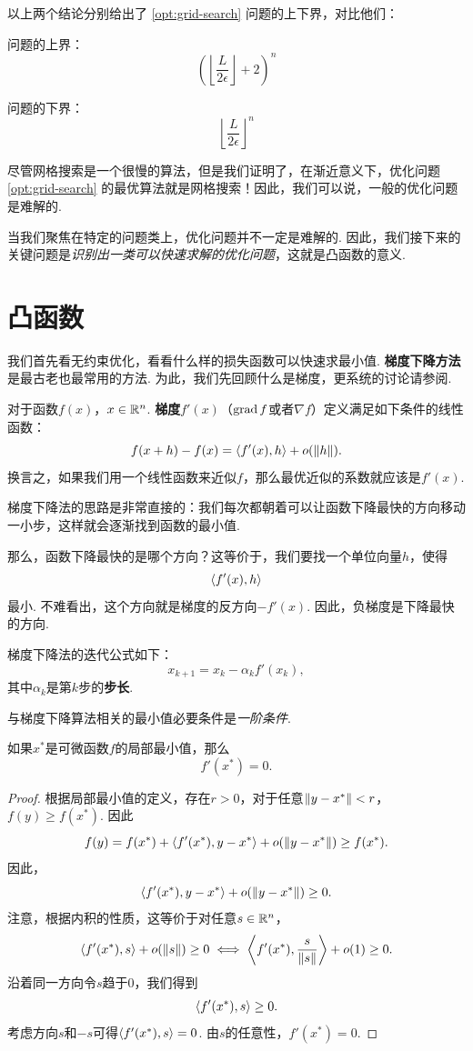 以上两个结论分别给出了 \eqref{opt:grid-search} 问题的上下界，对比他们：
\begin{center}
\begin{minipage}[t]{0.4\textwidth}
问题的上界：
\[\left(\left\lfloor\frac{L}{2\epsilon}\right\rfloor+2\right)^n\]
\end{minipage}
\begin{minipage}[t]{0.4\textwidth}
问题的下界：
    \[\left\lfloor\frac{L}{2\epsilon}\right\rfloor^n\]
\end{minipage}
\end{center}
尽管网格搜索是一个很慢的算法，但是我们证明了，在渐近意义下，优化问题 \eqref{opt:grid-search} 的最优算法就是网格搜索！因此，我们可以说，一般的优化问题是难解的. 

当我们聚焦在特定的问题类上，优化问题并不一定是难解的. 因此，我们接下来的关键问题是\textit{识别出一类可以快速求解的优化问题}，这就是凸函数的意义. 


\section{凸函数}\label{sec:convex-function}

我们首先看无约束优化，看看什么样的损失函数可以快速求最小值. \textbf{梯度下降方法}是最古老也最常用的方法. 为此，我们先回顾什么是梯度，更系统的讨论请参阅.

对于函数$f(x)$，$x\in\mathbb{R}^n$. \textbf{梯度}$f'(x)$（$\operatorname*{grad} f$或者$\nabla f$）定义满足如下条件的线性函数：
    \[f(x+h)-f(x)=\left\langle{f'(x)},{h}\right\rangle+o(\left\|h\right\|).\]
换言之，如果我们用一个线性函数来近似$f$，那么最优近似的系数就应该是$f'(x)$.

梯度下降法的思路是非常直接的：我们每次都朝着可以让函数下降最快的方向移动一小步，这样就会逐渐找到函数的最小值. 

那么，函数下降最快的是哪个方向？这等价于，我们要找一个单位向量$h$，使得
\[\left\langle{f'(x)},{h}\right\rangle\]
最小. 不难看出，这个方向就是梯度的反方向$-f'(x)$. 因此，负梯度是下降最快的方向. 

梯度下降法的迭代公式如下：
\[x_{k+1}=x_k-\alpha_k f'(x_k),\]
其中$\alpha_k$是第$k$步的\textbf{步长}. 

与梯度下降算法相关的最小值必要条件是\textit{一阶条件}. 

\begin{theorem}[一阶条件]\label{thm:first-order-condition}
    如果$x^*$是可微函数$f$的局部最小值，那么
    \[f'(x^*)=0.\]
\end{theorem}

\begin{proof}
根据局部最小值的定义，存在$r>0$，对于任意$\left\|y-x^*\right\|<r$，$f(y)\geq f(x^*)$. 因此
\[f(y)=f(x^*)+\left\langle{f'(x^*)},{y-x^*}\right\rangle+o(\left\|y-x^*\right\|)\geq f(x^*).\]
因此，
\[\left\langle{f'(x^*)},{y-x^*}\right\rangle+o(\left\|y-x^*\right\|)\geq 0.\]
注意，根据内积的性质，这等价于对任意$s\in\mathbb{R}^n$，
\[\left\langle{f'(x^*)},{s}\right\rangle+o(\left\|s\right\|)\geq 0\iff \left\langle{f'(x^*)},{\frac{s}{\left\|s\right\|}}\right\rangle+o(1)\geq 0.\]
沿着同一方向令$s$趋于$0$，我们得到
\[\left\langle{f'(x^*)},{s}\right\rangle\geq 0.\]
考虑方向$s$和$-s$可得$\left\langle{f'(x^*)},{s}\right\rangle=0$. 由$s$的任意性，$f'(x^*)=0$.
\end{proof}

